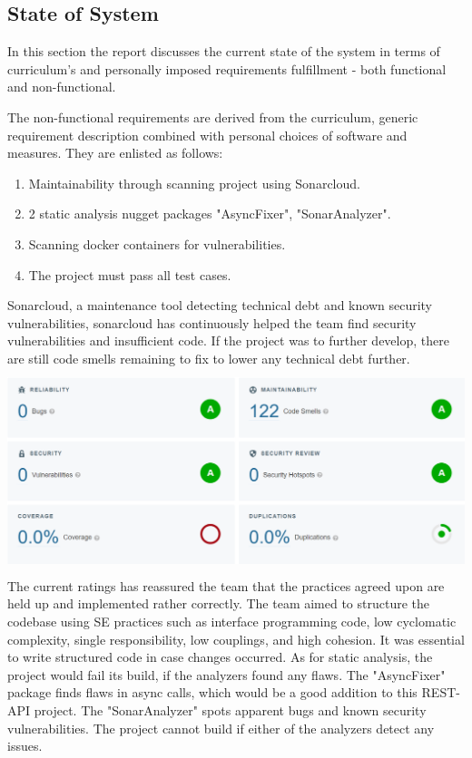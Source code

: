 \subsection{State of System}\label{stateofsystem}

In this section the report discusses the current state of the system in terms of curriculum's and personally imposed requirements fulfillment - both functional and non-functional. 



The non-functional requirements are derived from the curriculum, generic requirement description combined with personal choices of software and measures. They are enlisted as follows:

\begin{enumerate}[noitemsep]
  \item Maintainability through scanning project using Sonarcloud.
  \item 2 static analysis nugget packages "AsyncFixer", "SonarAnalyzer".
  \item Scanning docker containers for vulnerabilities.
  \item The project must pass all test cases.
\end{enumerate}

Sonarcloud, a maintenance tool detecting technical debt and known security vulnerabilities, sonarcloud has continuously helped the team find security vulnerabilities and insufficient code. If the project was to further develop, there are still code smells remaining to fix to lower any technical debt further.\\ \includegraphics[width=14cm, height=6cm]{images/sonarscan.PNG}\\ The current ratings has reassured the team that the practices agreed upon are held up and implemented rather correctly. The team aimed to structure the codebase using SE practices such as interface programming code, low cyclomatic complexity, single responsibility, low couplings, and high cohesion. It was essential to write structured code in case changes occurred. As for static analysis, the project would fail its build, if the analyzers found any flaws. The "AsyncFixer" package finds flaws in async calls, which would be a good addition to this REST-API project. The "SonarAnalyzer" spots apparent bugs and known security vulnerabilities. The project cannot build if either of the analyzers detect any issues. 
\vspace{3mm}

